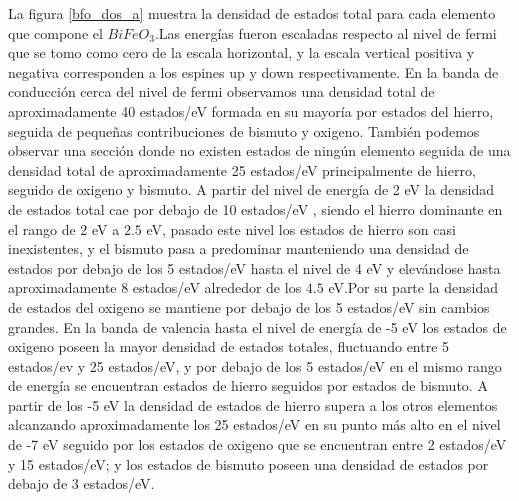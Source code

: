 


La figura \ref{bfo_dos_a}  muestra la densidad de estados 
total para cada 
elemento que compone el $BiFeO_{3}$.Las energ\'ias fueron escaladas respecto al 
nivel de fermi que se tomo como cero de la escala horizontal, y la escala 
vertical positiva y negativa corresponden a los espines up y down 
respectivamente. En la banda de conducci\'on cerca del 
nivel de fermi observamos una densidad total de aproximadamente 40 estados/eV 
formada en su mayor\'ia por estados del hierro, seguida de peque\~nas 
contribuciones de bismuto y oxigeno. Tambi\'en podemos observar una secci\'on 
donde no existen estados de ning\'un elemento seguida de una densidad total de 
aproximadamente 25 estados/eV principalmente de hierro, seguido de oxigeno y 
bismuto. A partir del nivel de energ\'ia de 2 eV la densidad de estados total 
cae por debajo de 10 estados/eV , siendo el hierro dominante en el rango de 
2 eV a $2.5$ eV, pasado este nivel los estados de hierro son casi inexistentes, 
y 
el bismuto pasa a predominar manteniendo una densidad de estados por debajo de 
los 5 estados/eV hasta el nivel de 4 eV y elev\'andose hasta aproximadamente 8 
estados/eV alrededor de los $4.5$ eV.Por su parte la densidad de estados del 
oxigeno se mantiene por debajo de los 5 estados/eV sin cambios grandes. 
En la banda de valencia hasta el nivel de energ\'ia de -5 eV los estados de 
oxigeno poseen la mayor densidad de estados totales, fluctuando entre 5 
estados/ev y 25 estados/eV, y por debajo de los 5 estados/eV en el mismo rango 
de energ\'ia se encuentran estados de hierro seguidos por estados de bismuto. A 
partir de los -5 eV la densidad de estados de hierro supera a los otros 
elementos alcanzando aproximadamente los 25 estados/eV en su punto m\'as alto 
en el nivel de -7 eV seguido por los estados de oxigeno que se encuentran entre 
2 estados/eV y 15 estados/eV; y los estados de bismuto poseen una densidad de 
estados por debajo de 3 estados/eV.


